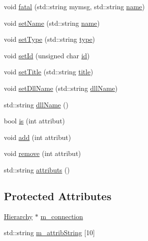 \begin{DoxyCompactItemize}
void \hyperlink{classObject_ae62acd3d09f716220f75f252dc38bc9a}{fatal} (std\+::string mymsg, std\+::string \hyperlink{classObject_a300f4c05dd468c7bb8b3c968868443c1}{name})
\item 
void \hyperlink{classObject_ae30fea75683c2d149b6b6d17c09ecd0c}{set\+Name} (std\+::string \hyperlink{classObject_a300f4c05dd468c7bb8b3c968868443c1}{name})
\item 
void \hyperlink{classObject_aae534cc9d982bcb9b99fd505f2e103a5}{set\+Type} (std\+::string \hyperlink{classObject_a84f99f70f144a83e1582d1d0f84e4e62}{type})
\item 
void \hyperlink{classObject_a398fe08cba594a0ce6891d59fe4f159f}{set\+Id} (unsigned char \hyperlink{classObject_af99145335cc61ff6e2798ea17db009d2}{id})
\item 
void \hyperlink{classObject_a89557dbbad5bcaa02652f5d7fa35d20f}{set\+Title} (std\+::string \hyperlink{classObject_a73a0f1a41828fdd8303dd662446fb6c3}{title})
\item 
void \hyperlink{classObject_a870c5af919958c2136623b2d7816d123}{set\+Dll\+Name} (std\+::string \hyperlink{classObject_a2e3947f2870094c332d7454117f3ec63}{dll\+Name})
\item 
std\+::string \hyperlink{classObject_a2e3947f2870094c332d7454117f3ec63}{dll\+Name} ()
\item 
bool \hyperlink{classAttrib_a704f26af560909ad22065083bb7d4c34}{is} (int attribut)
\item 
void \hyperlink{classAttrib_a235f773af19c900264a190b00a3b4ad7}{add} (int attribut)
\item 
void \hyperlink{classAttrib_a7d4ef7e32d93cb287792b87b857e79f3}{remove} (int attribut)
\item 
std\+::string \hyperlink{classAttrib_aee7bbf16b144887f196e1341b24f8a26}{attributs} ()
\end{DoxyCompactItemize}
\subsection*{Protected Attributes}
\begin{DoxyCompactItemize}
\item 
\hyperlink{classHierarchy}{Hierarchy} $\ast$ \hyperlink{classElement_abe3de7a5dbbc9a6dd2d7e012e5fdb266}{m\+\_\+connection}
\item 
std\+::string \hyperlink{classAttrib_a3414521d7a82476e874b25a5407b5e63}{m\+\_\+attrib\+String} \mbox{[}10\mbox{]}
\end{DoxyCompactItemize}


